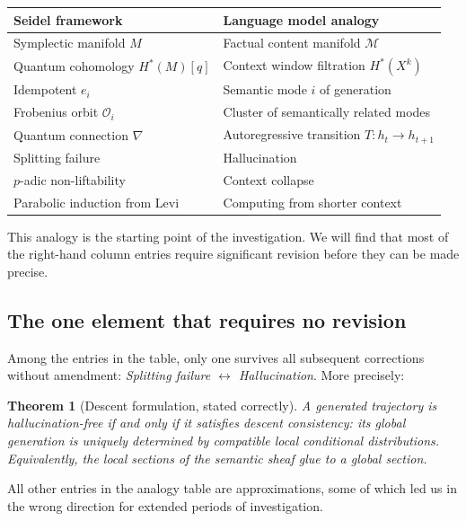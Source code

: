 \documentclass[11pt]{amsart}
\newtheorem{theorem}{Theorem}[section]
\theoremstyle{definition}
\begin{document}
\begin{center}
\begin{tabular}{ll}
\toprule
Seidel framework & Language model analogy \\
\midrule
Symplectic manifold $M$ & Factual content manifold $\mathcal{M}$ \\
Quantum cohomology $H^*(M)[q]$ & Context window filtration $H^*(X^k)$ \\
Idempotent $e_i$ & Semantic mode $i$ of generation \\
Frobenius orbit $\mathcal{O}_i$ & Cluster of semantically related modes \\
Quantum connection $\nabla$ & Autoregressive transition $T: h_t \to h_{t+1}$ \\
Splitting failure & Hallucination \\
$p$-adic non-liftability & Context collapse \\
Parabolic induction from Levi & Computing from shorter context \\
\bottomrule
\end{tabular}
\end{center}

This analogy is the starting point of the investigation.
We will find that most of the right-hand column entries require significant
revision before they can be made precise.

\subsection{The one element that requires no revision}

Among the entries in the table, only one survives all subsequent corrections
without amendment:
\emph{Splitting failure $\leftrightarrow$ Hallucination}.
More precisely:

\begin{theorem}[Descent formulation, stated correctly]
\label{thm:descent}
A generated trajectory is hallucination-free if and only if it satisfies
\emph{descent consistency}: its global generation is uniquely determined
by compatible local conditional distributions.
Equivalently, the local sections of the semantic sheaf glue to a global section.
\end{theorem}

All other entries in the analogy table are approximations, some of which
led us in the wrong direction for extended periods of investigation.

\end{document}

